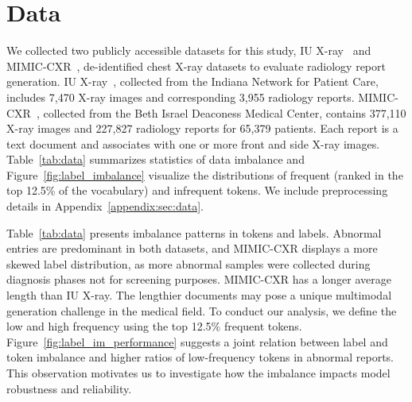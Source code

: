\documentclass[sn-mathphys-num]{sn-jnl}%
\theoremstyle{thmstyleone}%
\theoremstyle{thmstyletwo}%
\theoremstyle{thmstylethree}%
\begin{document}
\section{Data}
\label{sec:data}

We collected two publicly accessible datasets for this study, IU X-ray~\citep{demner2016preparing} and MIMIC-CXR~\cite{johnson2019mimic}, de-identified chest X-ray datasets to evaluate radiology report generation.
IU X-ray~\citep{demner2016preparing}, collected from the Indiana Network for Patient Care, includes 7,470 X-ray images and corresponding 3,955 radiology reports.
MIMIC-CXR~\citep{johnson2019mimic}, collected from the Beth Israel Deaconess Medical Center, contains 377,110 X-ray images and 227,827 radiology reports for 65,379 patients.
Each report is a text document and associates with one or more front and side X-ray images.
Table~\ref{tab:data} summarizes statistics of data imbalance and Figure~\ref{fig:label_imbalance} visualize the distributions of frequent (ranked in the top 12.5\% of the vocabulary) and infrequent tokens.
We include preprocessing details in Appendix~\ref{appendix:sec:data}.

\begin{table*}[t]
    \centering
    \caption{Data statistics summary. Variations exist in label (Normal and Abnormal \%) and average report length ($L$). }
    \label{tab:data}
\end{table*}

Table~\ref{tab:data} presents imbalance patterns in tokens and labels.
Abnormal entries are predominant in both datasets, and MIMIC-CXR displays a more skewed label distribution, as more abnormal samples were collected during diagnosis phases not for screening purposes.
MIMIC-CXR has a longer average length than IU X-ray. 
The lengthier documents may pose a unique multimodal generation challenge in the medical field. 
To conduct our analysis, we define the low and high frequency using the top 12.5\% frequent tokens. 
Figure~\ref{fig:label_im_performance}  suggests a joint relation between label and token imbalance and higher ratios of low-frequency tokens in abnormal reports.
This observation motivates us to investigate how the imbalance impacts model robustness and reliability.
\end{document}
